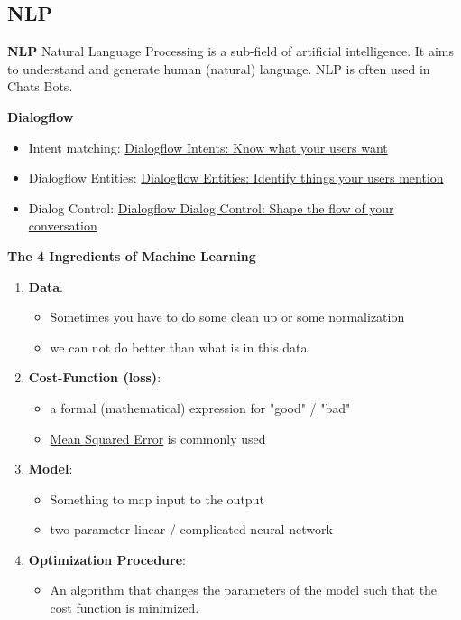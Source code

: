 \documentclass[11pt,twoside,landscape]{article}
\begin{document}
\begin{multicols}{3}
\section{NLP}
\label{sec:orgb08460b}
\textbf{NLP}
Natural Language Processing is a sub-field of artificial intelligence.
It aims to understand and generate human (natural) language.
NLP is often used in Chats Bots.

\textbf{Dialogflow}
\begin{itemize}
\item Intent matching: \href{https://www.youtube.com/watch?v=9aHusGxntPw}{Dialogflow Intents: Know what your users want}
\item Dialogflow Entities: \href{https://www.youtube.com/watch?v=kzdL6GxJ\_WY}{Dialogflow Entities: Identify things your users mention}
\item Dialog Control: \href{https://youtu.be/-tOamKtmxdY}{Dialogflow Dialog Control: Shape the flow of your conversation}
\end{itemize}



\textbf{The 4 Ingredients of Machine Learning}
\begin{enumerate}
\item \textbf{Data}:
\begin{itemize}
\item Sometimes you have to do some clean up or some normalization
\item we can not do better than what is in this data
\end{itemize}
\item \textbf{Cost-Function (loss)}:
\begin{itemize}
\item a formal (mathematical) expression for "good" / "bad"
\item \href{../../../roam/20211004175550-mean_squared_error.org}{Mean Squared Error} is commonly used
\end{itemize}
\item \textbf{Model}:
\begin{itemize}
\item Something to map input to the output
\item two parameter linear / complicated neural network
\end{itemize}
\item \textbf{Optimization Procedure}:
\begin{itemize}
\item An algorithm that changes the parameters of the model such that the cost function is minimized.
\end{itemize}
\end{enumerate}


\end{multicols}
\end{document}
